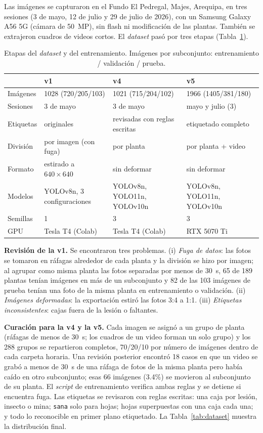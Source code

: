 \documentclass[sensors,article,submit,pdftex,moreauthors]{Definitions/mdpi}
\begin{document}
Las imágenes se capturaron en el Fundo El Pedregal, Majes, Arequipa, en tres sesiones (3 de mayo, 12 de julio y 29 de julio de 2026), con un Samsung Galaxy A56 5G (cámara de 50~MP), sin flash ni modificación de las plantas. También se extrajeron cuadros de videos cortos. El \emph{dataset} pasó por tres etapas (Tabla~\ref{tab:etapas}).

\begin{table}[H]
\caption{Etapas del \emph{dataset} y del entrenamiento. Imágenes por subconjunto: entrenamiento / validación / prueba.\label{tab:etapas}}
\begin{tabularx}{\textwidth}{lXXX}
\toprule
& \textbf{v1} & \textbf{v4} & \textbf{v5}\\
\midrule
Imágenes & 1028 (720/205/103) & 1021 (715/204/102) & 1966 (1405/381/180)\\
Sesiones & 3 de mayo & 3 de mayo & mayo y julio (3)\\
Etiquetas & originales & revisadas con reglas escritas & etiquetado completo\\
División & por imagen (con fuga) & por planta & por planta + video\\
Formato & estirado a $640\times640$ & sin deformar & sin deformar\\
Modelos & YOLOv8n, 3 configuraciones & YOLOv8n, YOLO11n, YOLOv10n & YOLOv8n, YOLO11n, YOLOv10n\\
Semillas & 1 & 3 & 3\\
GPU & Tesla T4 (Colab) & Tesla T4 (Colab) & RTX 5070 Ti\\
\bottomrule
\end{tabularx}
\end{table}

\textbf{Revisión de la v1.} Se encontraron tres problemas. (i) \emph{Fuga de datos}: las fotos se tomaron en ráfagas alrededor de cada planta y la división se hizo por imagen; al agrupar como misma planta las fotos separadas por menos de 30~s, 65 de 189 plantas tenían imágenes en más de un subconjunto y 82 de las 103 imágenes de prueba tenían una foto de la misma planta en entrenamiento o validación. (ii) \emph{Imágenes deformadas}: la exportación estiró las fotos 3:4 a 1:1. (iii) \emph{Etiquetas inconsistentes}: cajas fuera de la lesión o faltantes.

\textbf{Curación para la v4 y la v5.} Cada imagen se asignó a un grupo de planta (ráfagas de menos de 30~s; los cuadros de un video forman un solo grupo) y los 288 grupos se repartieron completos, 70/20/10 por número de imágenes dentro de cada carpeta horaria. Una revisión posterior encontró 18 casos en que un video se grabó a menos de 30~s de una ráfaga de fotos de la misma planta pero había caído en otro subconjunto; esas 66 imágenes (3.4\%) se movieron al subconjunto de su planta. El \emph{script} de entrenamiento verifica ambas reglas y se detiene si encuentra fuga. Las etiquetas se revisaron con reglas escritas: una caja por lesión, insecto o mina; \texttt{sana} solo para hojas; hojas superpuestas con una caja cada una; y todo lo reconocible en primer plano etiquetado. La Tabla~\ref{tab:dataset} muestra la distribución final.
\end{document}
